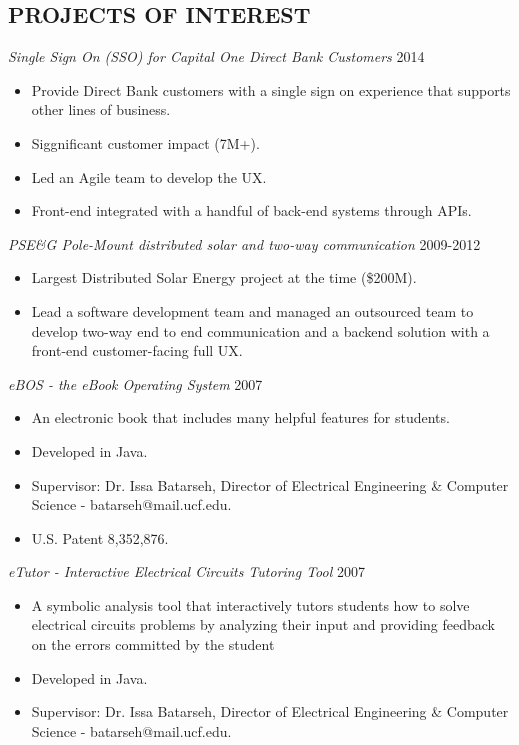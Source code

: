 \documentclass[line,margin]{res}
\begin{document}
\begin{resume}
\section{PROJECTS OF INTEREST}

{\sl Single Sign On (SSO) for Capital One Direct Bank Customers} \hfill   2014 \\
\begin{itemize} \itemsep -2pt
     \item Provide Direct Bank customers with a single sign on experience 
            that supports other lines of business.
     \item Siggnificant customer impact (7M+).
     \item Led an Agile team to develop the UX.
     \item Front-end integrated with a handful of back-end systems through APIs.
\end{itemize} 

{\sl PSE\&G Pole-Mount distributed solar and two-way communication} \hfill   2009-2012 \\
\begin{itemize} \itemsep -2pt
     \item Largest Distributed Solar Energy project at the time (\$200M).
     \item Lead a software development team and managed an outsourced team 
            to develop two-way end to end communication and a backend solution with 
            a front-end customer-facing full UX.
\end{itemize} 

{\sl eBOS - the eBook Operating System} \hfill   2007 \\
\begin{itemize} \itemsep -2pt
     \item An electronic book that includes many helpful features for students.
     \item Developed in Java.
     \item Supervisor: Dr. Issa Batarseh, Director of Electrical Engineering \&
     Computer Science - batarseh@mail.ucf.edu.
     \item U.S. Patent 8,352,876.
\end{itemize} 

{\sl eTutor - Interactive Electrical Circuits Tutoring Tool} \hfill   2007 \\
\begin{itemize} \itemsep -2pt
     \item A symbolic analysis tool that interactively tutors students how to
     solve electrical circuits problems by analyzing their input and providing
     feedback on the errors committed by the student
     \item Developed in Java.
     \item Supervisor: Dr. Issa Batarseh, Director of Electrical Engineering \&
     Computer Science - batarseh@mail.ucf.edu.
\end{itemize} 


\end{resume}
\end{document}
